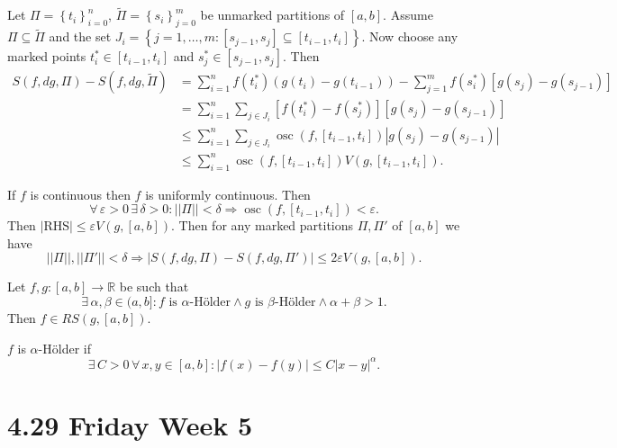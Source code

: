 \documentclass{notes}
\begin{document}
  \newpage
  
  \begin{prf}
    Let $\Pi = \left \{ t_i \right \}_{i = 0}^n$, $\tilde \Pi = \left \{ s_i \right \}_{j = 0}^m$ be unmarked partitions of $[a, b]$.
    Assume $\Pi \subseteq \tilde \Pi$ and the set $J_i = \left \{ j = 1, \dots, m : [s_{j - 1}, s_j] \subseteq [t_{i - 1}, t_i] \right \}$.
    Now choose any marked points $t^*_i \in [t_{i - 1}, t_i]$ and $s^*_j \in [s_{j - 1}, s_j]$.
    Then 
    \begin{align*}
      S(f, dg, \Pi) - S(f, dg, \tilde \Pi) &= \sum_{i = 1}^n f(t^*_i) (g(t_i) - g(t_{i - 1})) - \sum_{j = 1}^m f(s^*_i) [g(s_j) - g(s_{j - 1})] \\ 
      &= \sum_{i = 1}^n \sum_{j \in J_i} [f(t^*_i) - f(s^*_j)] [g(s_j) - g(s_{j - 1})] \\ 
      &\leq \sum_{i = 1}^n \sum_{j \in J_i} \operatorname{osc}(f, [t_{i - 1}, t_i]) \left | g(s_j) - g(s_{j - 1}) \right | \\ 
      &\leq \sum_{i = 1}^n \operatorname{osc}(f, [t_{i - 1}, t_i]) V(g, [t_{i - 1}, t_i]).
    \end{align*}
    
    If $f$ is continuous then $f$ is uniformly continuous.
    Then 
    \[
      \forall \, \varepsilon > 0 \, \exists \, \delta > 0: ||\Pi|| < \delta \Rightarrow \operatorname{osc}(f, [t_{i - 1}, t_i]) < \varepsilon.
    \]
    Then $\left | \text{RHS} \right | \leq \varepsilon V(g, [a, b])$.
    Then for any marked partitions $\Pi, \Pi'$ of $[a, b]$ we have 
    \[
      ||\Pi||, ||\Pi'|| < \delta \Rightarrow \left | S(f, dg, \Pi) - S(f, dg, \Pi') \right | \leq 2 \varepsilon V(g, [a, b]).
    \]
  \end{prf}
  
  \begin{thm}
    Let $f, g \colon [a, b] \to \mathbb R$ be such that 
    \[
      \exists \, \alpha, \beta \in (a, b]: \text{$f$ is $\alpha$-Hölder} \land \text{$g$ is $\beta$-Hölder} \land \alpha + \beta > 1.
    \]
    Then $f \in RS(g, [a, b])$.
    
    \begin{note}
      $f$ is $\alpha$-Hölder if 
      \[
        \exists \, C > 0 \, \forall \, x, y \in [a, b]: \left | f(x) - f(y) \right | \leq C \left | x - y \right |^\alpha.
      \]
    \end{note}
  \end{thm}
  
  \section{4.29 Friday Week 5}
\end{document}
